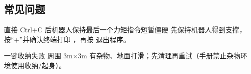 \subsection*{常见问题}
\begin{faq}{直接 Ctrl+C 后机器人保持最后一个力矩指令短暂僵硬}
先保持机器人得到支撑，按“+”并确认终端打印 ，再按  退出程序。
\end{faq}
\begin{faq}{一键收纳失败}
周围 3m$\times$3m 有杂物、地面打滑；先清理再重试（手册禁止杂物环境使用收纳/起身）。
\end{faq}
